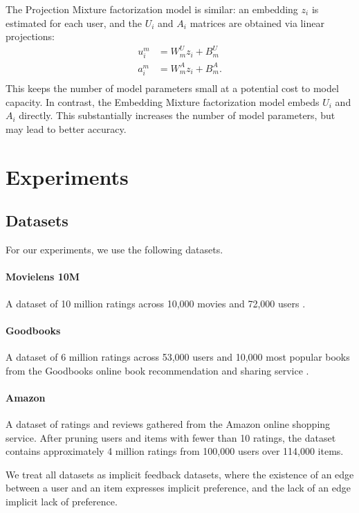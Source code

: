 \documentclass[sigchi]{acmart}
\begin{document}
The Projection Mixture factorization model is similar: an embedding $z_i$ is estimated for each user, and the $U_i$ and $A_i$ matrices are obtained via linear projections:
\begin{equation}
\begin{aligned}
  u^m_{i} &= W^U_mz_{i} + B^U_m\\
  a^m_{i} &= W^A_mz_{i} + B^A_m.\\
\end{aligned}
\end{equation}
This keeps the number of model parameters small at a potential cost to model capacity. In contrast, the Embedding Mixture factorization model embeds $U_i$ and $A_i$ directly. This substantially increases the number of model parameters, but may lead to better accuracy.

\section{Experiments}
\subsection{Datasets}
For our experiments, we use the following datasets.

\paragraph{Movielens 10M} A dataset of 10 million ratings across 10,000 movies and 72,000 users \citep{harper2016movielens}.
\paragraph{Goodbooks} A dataset of 6 million ratings across 53,000 users and 10,000 most popular books from the Goodbooks online book recommendation and sharing service \citep{goodbooks2017}.
\paragraph{Amazon} A dataset of ratings and reviews gathered from the Amazon online shopping service. After pruning users and items with fewer than 10 ratings, the dataset contains approximately 4 million ratings from 100,000 users over 114,000 items.

We treat all datasets as implicit feedback datasets, where the existence of an edge between a user and an item expresses implicit preference, and the lack of an edge implicit lack of preference.
\end{document}
